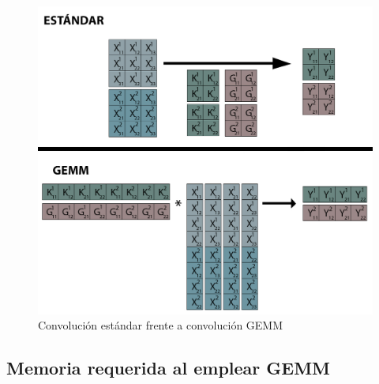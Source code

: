 \begin{figure}[H]
	\hspace{-5mm}
	\includegraphics[scale=0.35]{imagenes/conv_std_vs_gemm.jpg}  
	\caption{Convolución estándar frente a convolución GEMM}
	\label{fig:conv_std_vs_gemm}
\end{figure}

\subsection{Memoria requerida al emplear GEMM}

